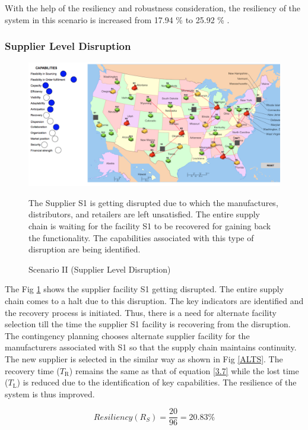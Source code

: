 With the help of the resiliency and robustness consideration, the resiliency of the system in this scenario is increased from 17.94 \% to 25.92 \% .

\subsubsection{Supplier Level Disruption}

\begin{figure}[H]
  \centering
  \includegraphics[width=6.5in]{figures/pdf/S2SLD.png}\\
  \caption{Scenario II (Supplier Level Disruption)}
   {The Supplier S1 is getting disrupted due to which the manufactures, distributors, and retailers are left unsatisfied. The entire supply chain is waiting for the facility S1 to be recovered for gaining back the functionality. The capabilities associated with this type of disruption are being identified.}
  \label{S2SL}
\end{figure}   

The Fig \ref{S2SL} shows the supplier facility S1 getting disrupted. The entire supply chain comes to a halt due to this disruption. The key indicators are identified and the recovery process is initiated. Thus, there is a need for alternate facility selection till the time the supplier S1 facility is recovering from the disruption. The contingency planning chooses alternate supplier facility for the manufacturers associated with S1 so that the supply chain maintains continuity. The new supplier is selected in the similar way as shown in Fig \ref{ALTS}. The recovery time ($T_{\text{R}}$) remains the same as that of equation \ref{3.7} while the lost time ($T_{\text{L}}$) is reduced due to the identification of key capabilities. The resilience of the system is thus improved.

\begin{equation}
    Resiliency(R_S) = \frac{20}{96} = 20.83 \% \label{3.22}
\end{equation}

